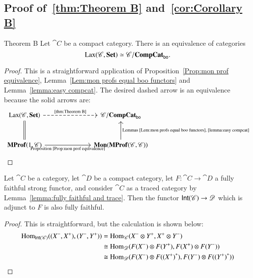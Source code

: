 \documentclass[12pt,oneside,article,draft]{memoir}
\begin{document}
\begin{enumerate}
\section{Proof of~\ref{thm:Theorem B} and~\ref{cor:Corollary B}}\label{sec:proof of Bs}

\begin{named}{Theorem B}\label{thm:Theorem B}
	Let $\cat{C}$ be a compact category. There is an equivalence of categories
	\[
		\operatorname{Lax}(\mathscr{C},\mathbf{Set})\simeq\mathscr{C}/\mathbf{CompCat}_{\mathsf{bo}}.
	\]
\end{named}
\begin{proof}
	This is a straightforward application of Proposition~\ref{Prop:mon prof equivalence}, Lemma~\ref{Lem:mon profs equal boo functors} and Lemma~\ref{lemma:easy compcat}.
	The desired dashed arrow is an equivalence because the solid arrows are:
	$$
	\begin{tikzcd}[column sep=2.5cm,row sep=1cm]
		\Lax(\cat{C},\Set)\ar[d,equal]\ar[r,dashed,"\tn{\ref{thm:Theorem B}}"]
			&\cat{C}/\CompCat_{\bo} \\
		\MProf(1,\cat{C})\ar[r,"\tn{Proposition~\ref{Prop:mon prof equivalence}}"']
			&\Mon(\MProf(\cat{C},\cat{C}))\ar[u,"\tn{Lemmas~\ref{Lem:mon profs equal boo functors},~\ref{lemma:easy compcat}}"']
	\end{tikzcd}
	$$
\end{proof} 

\begin{lemma}\label{lemma:more fully faithfulness}
	Let $\cat{C}$ be a category, let $\cat{D}$ be a compact category, let $F\colon\cat{C}\to\cat{D}$ a fully faithful strong functor, and consider $\cat{C}$ as a traced category by Lemma~\ref{lemma:fully faithful and trace}. Then the functor $\mathsf{Int}(\mathscr{C})\to\mathscr{D}$ which is adjunct to $F$ is also fully faithful.
\end{lemma}
\begin{proof}
	This is straightforward, but the calculation is shown below:
	\begin{align*}
		\operatorname{Hom}_{\mathsf{Int}(\mathscr{C})}((X^-,X^+),(Y^-,Y^+))&=\operatorname{Hom}_{\mathscr{C}}(X^-\otimes Y^+,X^+\otimes Y^-) \\
		&\cong\operatorname{Hom}_{\mathscr{D}}(F(X^-)\otimes F(Y^+),F(X^+)\otimes F(Y^-)) \\
		&\cong\operatorname{Hom}_{\mathscr{D}}(F(X^-)\otimes F({(X^+)}^*),F(Y^-)\otimes F({(Y^+)}^*))
	\end{align*}
\end{proof}


\end{enumerate}
\end{document}

